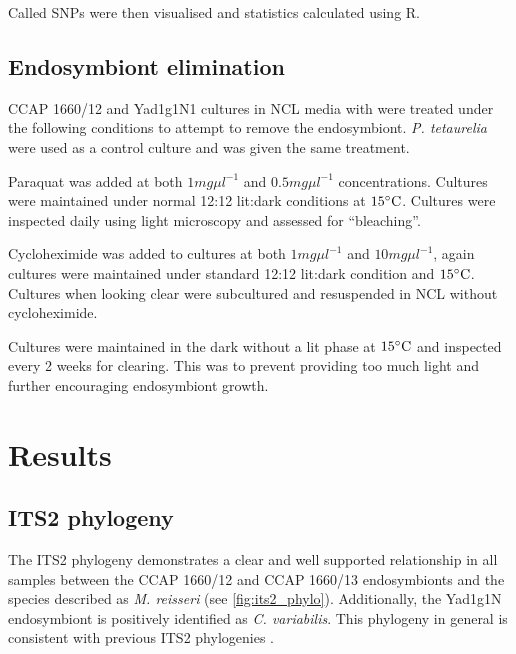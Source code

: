 Called SNPs were then visualised and statistics
calculated using R.

\subsection{Endosymbiont elimination}

CCAP 1660/12 and Yad1g1N1 cultures in NCL media with were treated under the following
conditions to attempt to remove the endosymbiont. 
\textit{P. tetaurelia} were used as a control culture and was
given the same treatment. 

Paraquat was added at both \(1mg\mu l^{-1}\) and
\(0.5mg\mu l^{-1}\) concentrations.
Cultures were maintained under normal 12:12 lit:dark 
conditions at \(15\celsius\).  Cultures were inspected
daily using light microscopy and assessed for ``bleaching''.

Cycloheximide was added to cultures at both \(1mg\mu l^{-1}\)
and \(10mg\mu l^{-1}\), again cultures were maintained under
standard 12:12 lit:dark condition and \(15\celsius\). 
Cultures when looking clear were subcultured and resuspended in 
NCL without cycloheximide.

Cultures were maintained in the dark without a lit phase
at \(15\celsius\) and inspected every 2 weeks for clearing.
This was to prevent providing too much light and 
further encouraging endosymbiont growth. 


\section{Results}

\subsection{ITS2 phylogeny}

The ITS2 phylogeny demonstrates a clear and well supported relationship in all samples 
between the CCAP 1660/12 and CCAP 1660/13 endosymbionts and the species described as 
\textit{M. reisseri} (see \cref{fig:its2_phylo}).  Additionally,
the Yad1g1N endosymbiont is positively identified as \textit{C. variabilis}. 
This phylogeny in general is consistent with previous ITS2 phylogenies \citep{Hoshina2010}.

